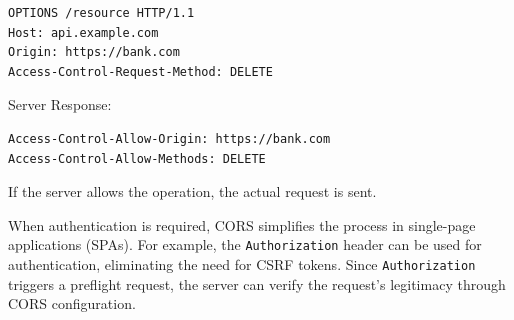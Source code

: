 \begin{verbatim}
OPTIONS /resource HTTP/1.1
Host: api.example.com
Origin: https://bank.com
Access-Control-Request-Method: DELETE    
\end{verbatim}
Server Response:
\begin{verbatim}
Access-Control-Allow-Origin: https://bank.com
Access-Control-Allow-Methods: DELETE    
\end{verbatim}
If the server allows the operation, the actual request is sent.

When authentication is required, CORS simplifies the process in single-page applications (SPAs). For example, the \texttt{Authorization} header can be used for authentication, eliminating the need for CSRF tokens. Since \texttt{Authorization} triggers a preflight request, the server can verify the request’s legitimacy through CORS configuration.